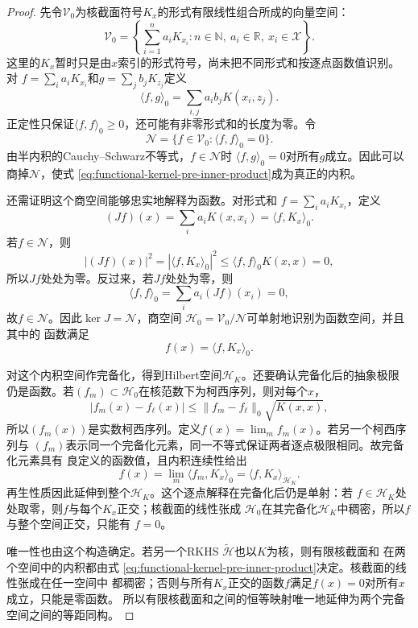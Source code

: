 \begin{proof}
先令$\mathcal{V}_0$为核截面符号$K_x$的形式有限线性组合所成的向量空间：
\[
  \mathcal{V}_0
  =
  \left\{
    \sum_{i=1}^{n}a_iK_{x_i}:
    n\in\mathbb{N},\
    a_i\in\mathbb{R},\
    x_i\in\mathcal{X}
  \right\}.
\]
这里的$K_x$暂时只是由$x$索引的形式符号，尚未把不同形式和按逐点函数值识别。
对
$f=\sum_i a_iK_{x_i}$和$g=\sum_jb_jK_{z_j}$定义
\begin{equation}
  \langle f,g\rangle_0
  =
  \sum_{i,j}a_i b_jK(x_i,z_j).
  \label{eq:functional-kernel-pre-inner-product}
\end{equation}
正定性只保证$\langle f,f\rangle_0\geq0$，还可能有非零形式和的长度为零。令
\[
  \mathcal{N}
  =
  \{f\in\mathcal{V}_0:\langle f,f\rangle_0=0\}.
\]
由半内积的Cauchy--Schwarz不等式，$f\in\mathcal{N}$时
$\langle f,g\rangle_0=0$对所有$g$成立。因此可以商掉$\mathcal{N}$，使式
\eqref{eq:functional-kernel-pre-inner-product}成为真正的内积。

还需证明这个商空间能够忠实地解释为函数。对形式和
$f=\sum_i a_iK_{x_i}$，定义
\[
  (Jf)(x)
  =
  \sum_i a_iK(x,x_i)
  =
  \langle f,K_x\rangle_0.
\]
若$f\in\mathcal{N}$，则
\[
  |(Jf)(x)|^2
  =
  |\langle f,K_x\rangle_0|^2
  \leq
  \langle f,f\rangle_0K(x,x)
  =0,
\]
所以$Jf$处处为零。反过来，若$Jf$处处为零，则
\[
  \langle f,f\rangle_0
  =
  \sum_i a_i(Jf)(x_i)
  =0,
\]
故$f\in\mathcal{N}$。因此$\ker J=\mathcal{N}$，商空间
$\mathcal{H}_0=\mathcal{V}_0/\mathcal{N}$可单射地识别为函数空间，并且其中的
函数满足
\[
  f(x)=\langle f,K_x\rangle_0.
\]

对这个内积空间作完备化，得到Hilbert空间$\mathcal{H}_K$。还要确认完备化后的抽象极限
仍是函数。若$(f_m)\subset\mathcal{H}_0$在核范数下为柯西序列，则对每个$x$，
\[
  |f_m(x)-f_\ell(x)|
  \leq
  \lVert f_m-f_\ell\rVert_0\sqrt{K(x,x)},
\]
所以$(f_m(x))$是实数柯西序列。定义$f(x)=\lim_m f_m(x)$。若另一个柯西序列与
$(f_m)$表示同一个完备化元素，同一不等式保证两者逐点极限相同。故完备化元素具有
良定义的函数值，且内积连续性给出
\[
  f(x)
  =
  \lim_m\langle f_m,K_x\rangle_0
  =
  \langle f,K_x\rangle_{\mathcal{H}_K}.
\]
再生性质因此延伸到整个$\mathcal{H}_K$。这个逐点解释在完备化后仍是单射：若
$f\in\mathcal{H}_K$处处取零，则$f$与每个$K_x$正交；核截面的线性张成
$\mathcal{H}_0$在其完备化$\mathcal{H}_K$中稠密，所以$f$与整个空间正交，只能有
$f=0$。

唯一性也由这个构造确定。若另一个RKHS $\widetilde{\mathcal{H}}$也以$K$为核，则有限核截面和
在两个空间中的内积都由式
\eqref{eq:functional-kernel-pre-inner-product}决定。核截面的线性张成在任一空间中
都稠密；否则与所有$K_x$正交的函数$f$满足$f(x)=0$对所有$x$成立，只能是零函数。
所以有限核截面和之间的恒等映射唯一地延伸为两个完备空间之间的等距同构。
\end{proof}

